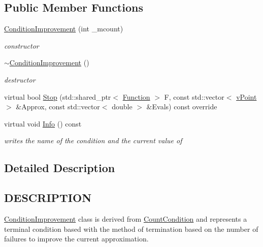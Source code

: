 \subsection*{Public Member Functions}
\begin{DoxyCompactItemize}
\item 
\mbox{\label{class_condition_improvement_aeff76aebcc0ce426a5dcd519547785be}} 
\hyperlink{class_condition_improvement_aeff76aebcc0ce426a5dcd519547785be}{Condition\+Improvement} (int \+\_\+mcount)
\begin{DoxyCompactList}\small\item\em constructor \end{DoxyCompactList}\item 
\mbox{\label{class_condition_improvement_a1148c246d35ac61028db95d8c9289427}} 
\hyperlink{class_condition_improvement_a1148c246d35ac61028db95d8c9289427}{$\sim$\+Condition\+Improvement} ()
\begin{DoxyCompactList}\small\item\em destructor \end{DoxyCompactList}\item 
virtual bool \hyperlink{class_condition_improvement_a012d8db22fd6fcf8a71ab0fb5ecc1940}{Stop} (std\+::shared\+\_\+ptr$<$ \hyperlink{class_function}{Function} $>$ F, const std\+::vector$<$ \hyperlink{classv_point}{v\+Point} $>$ \&Approx, const std\+::vector$<$ double $>$ \&Evals) const override
\item 
\mbox{\label{class_condition_improvement_a88b5dfa7c724f8d75276d4a65eb1f398}} 
virtual void \hyperlink{class_condition_improvement_a88b5dfa7c724f8d75276d4a65eb1f398}{Info} () const
\begin{DoxyCompactList}\small\item\em writes the name of the condition and the current value of \end{DoxyCompactList}\end{DoxyCompactItemize}


\subsection{Detailed Description}
\hypertarget{function_8h_DESCRIPTION}{}\subsection{D\+E\+S\+C\+R\+I\+P\+T\+I\+ON}\label{function_8h_DESCRIPTION}
\hyperlink{class_condition_improvement}{Condition\+Improvement} class is derived from \hyperlink{class_count_condition}{Count\+Condition} and represents a terminal condition based with the method of termination based on the number of failures to improve the current approximation. 

